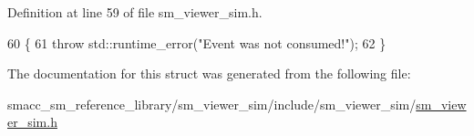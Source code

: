 Definition at line 59 of file sm\+\_\+viewer\+\_\+sim.\+h.


\begin{DoxyCode}
60     \{
61         \textcolor{keywordflow}{throw} std::runtime\_error(\textcolor{stringliteral}{"Event was not consumed!"});
62     \}
\end{DoxyCode}


The documentation for this struct was generated from the following file\+:\begin{DoxyCompactItemize}
\item 
smacc\+\_\+sm\+\_\+reference\+\_\+library/sm\+\_\+viewer\+\_\+sim/include/sm\+\_\+viewer\+\_\+sim/\hyperlink{sm__viewer__sim_8h}{sm\+\_\+viewer\+\_\+sim.\+h}\end{DoxyCompactItemize}
